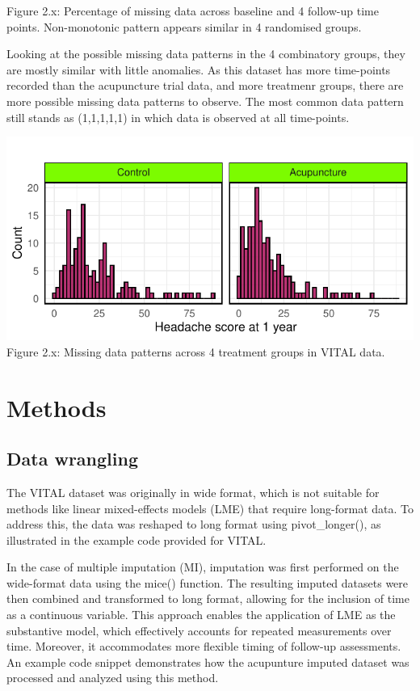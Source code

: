 \documentclass{article}
\begin{document}
Figure 2.x: Percentage of missing data across baseline and 4 follow-up
time points. Non-monotonic pattern appears similar in 4 randomised
groups.

Looking at the possible missing data patterns in the 4 combinatory
groups, they are mostly similar with little anomalies. As this dataset
has more time-points recorded than the acupuncture trial data, and more
treatmenr groups, there are more possible missing data patterns to
observe. The most common data pattern still stands as (1,1,1,1,1) in
which data is observed at all time-points.

\includegraphics{Final_Report_files/figure-latex/unnamed-chunk-13-1.pdf}
Figure 2.x: Missing data patterns across 4 treatment groups in VITAL
data.

\section{Methods}\label{methods}

\subsection{Data wrangling}\label{data-wrangling}

The VITAL dataset was originally in wide format, which is not suitable
for methods like linear mixed-effects models (LME) that require
long-format data. To address this, the data was reshaped to long format
using pivot\_longer(), as illustrated in the example code provided for
VITAL.

In the case of multiple imputation (MI), imputation was first performed
on the wide-format data using the mice() function. The resulting imputed
datasets were then combined and transformed to long format, allowing for
the inclusion of time as a continuous variable. This approach enables
the application of LME as the substantive model, which effectively
accounts for repeated measurements over time. Moreover, it accommodates
more flexible timing of follow-up assessments. An example code snippet
demonstrates how the acupunture imputed dataset was processed and
analyzed using this method.
\end{document}
